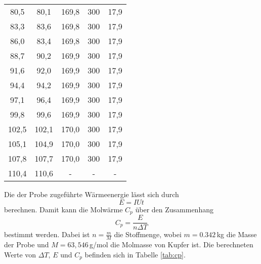 \begin{table}[htp]
\begin{center}
\begin{tabular}{ccccc}
			80,5 & 80,1 & 169,8 & 300 & 17,9\\
			83,3 & 83,6 & 169,8 & 300 & 17,9\\
			86,0 & 83,4 & 169,8 & 300 & 17,9\\
			88,7 & 90,2 & 169,9 & 300 & 17,9\\
			91,6 & 92,0 & 169,9 & 300 & 17,9\\
			94,4 & 94,2 & 169,9 & 300 & 17,9\\
			97,1 & 96,4 & 169,9 & 300 & 17,9\\
			99,8 & 99,6 & 169,9 & 300 & 17,9\\
			102,5 & 102,1 & 170,0 & 300 & 17,9\\
			105,1 & 104,9 & 170,0 & 300 & 17,9\\
			107,8 & 107,7 & 170,0 & 300 & 17,9\\
			110,4 & 110,6 & - & -& -\\
		\bottomrule
		\end{tabular}
	\end{center}
\end{table}

Die der Probe zugeführte Wärmeenergie lässt sich durch
\begin{equation*}
  E=IUt
\end{equation*}
berechnen. Damit kann die Molwärme $C_p$ über den Zusammenhang
\begin{equation*}
  C_p=\frac{E}{n \Delta T}
\end{equation*}
bestimmt werden. Dabei ist $n=\frac{m}{M}$ die Stoffmenge, wobei $m=0.342$\,kg die
Masse der Probe und $M=63,546$\,g/mol \cite{Molmasse} die Molmasse von Kupfer ist.
Die berechneten Werte von $\Delta T$, $E$ und $C_p$ befinden sich in Tabelle \ref{tab:cp}.


